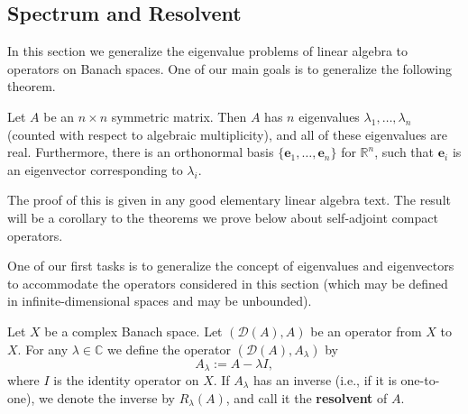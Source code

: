 \subsection{Spectrum and Resolvent}\label{sec:spectrum-and-resolvent}

In this section we generalize the eigenvalue problems of linear algebra to operators on Banach spaces. One of our main goals is to generalize the following theorem.

\begin{Theorem}
\label{thm:symmetric-matrix-spectral-basis}
Let $A$ be an $n\times n$ symmetric matrix. Then $A$ has $n$ eigenvalues $\lambda_1,\ldots,\lambda_n$ (counted with respect to algebraic multiplicity), and all of these eigenvalues are real. Furthermore, there is an orthonormal basis $\{\bm{e}_1,\ldots,\bm{e}_n\}$ for $\mathbb{R}^n$, such that $\bm{e}_i$ is an eigenvector corresponding to $\lambda_i$.
\end{Theorem}

The proof of this is given in any good elementary linear algebra text. The result will be a corollary to the theorems we prove below about self-adjoint compact operators.

One of our first tasks is to generalize the concept of eigenvalues and eigenvectors to accommodate the operators considered in this section (which may be defined in infinite-dimensional spaces and may be unbounded).

\begin{Definition}
\label{def:shifted-operator-and-resolvent}
Let $X$ be a complex Banach space. Let $(\mathcal{D}(A),A)$ be an operator from $X$ to $X$. For any $\lambda\in\mathbb{C}$ we define the operator $(\mathcal{D}(A),A_\lambda)$ by
\begin{equation}\label{eq:shifted-operator-definition}
A_\lambda:=A-\lambda I,
\end{equation}
where $I$ is the identity operator on $X$. If $A_\lambda$ has an inverse (i.e., if it is one-to-one), we denote the inverse by $R_\lambda(A)$, and call it the \textbf{resolvent} of $A$.
\end{Definition}

